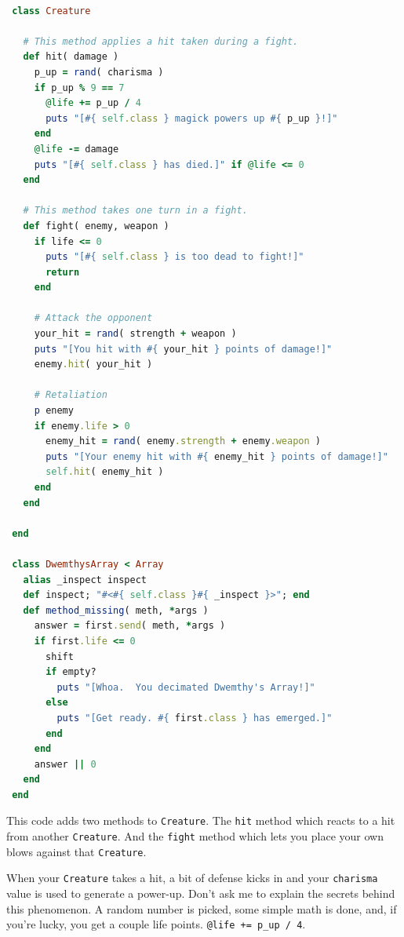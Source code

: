 \documentclass[10pt,twoside]{report}
\begin{document}
\begin{lstlisting}[basicstyle=\ttfamily\color{basiccolor},
    commentstyle = \ttfamily\color{commentcolor},
    keywordstyle=\ttfamily\color{keywordscolor},
    stringstyle=\color{stringcolor},
    language=Ruby,
    basicstyle=\small\ttfamily,
    showstringspaces=false,
  ]

 class Creature

   # This method applies a hit taken during a fight.
   def hit( damage )
     p_up = rand( charisma )
     if p_up % 9 == 7
       @life += p_up / 4
       puts "[#{ self.class } magick powers up #{ p_up }!]"
     end
     @life -= damage
     puts "[#{ self.class } has died.]" if @life <= 0
   end

   # This method takes one turn in a fight.
   def fight( enemy, weapon )
     if life <= 0
       puts "[#{ self.class } is too dead to fight!]"
       return
     end

     # Attack the opponent
     your_hit = rand( strength + weapon )
     puts "[You hit with #{ your_hit } points of damage!]"
     enemy.hit( your_hit )

     # Retaliation
     p enemy
     if enemy.life > 0
       enemy_hit = rand( enemy.strength + enemy.weapon )
       puts "[Your enemy hit with #{ enemy_hit } points of damage!]"
       self.hit( enemy_hit )
     end
   end

 end

 class DwemthysArray < Array
   alias _inspect inspect
   def inspect; "#<#{ self.class }#{ _inspect }>"; end
   def method_missing( meth, *args )
     answer = first.send( meth, *args )
     if first.life <= 0
       shift
       if empty?
         puts "[Whoa.  You decimated Dwemthy's Array!]"
       else
         puts "[Get ready. #{ first.class } has emerged.]"
       end
     end
     answer || 0
   end
 end

\end{lstlisting}


This code adds two methods to \lstinline[breaklines=true]|Creature|.
The \lstinline[breaklines=true]|hit| method which reacts to a hit from
another \lstinline[breaklines=true]|Creature|.  And the
\lstinline[breaklines=true]|fight| method which lets you place your
own blows against that \lstinline[breaklines=true]|Creature|.

When your \lstinline[breaklines=true]|Creature| takes a hit, a bit of
defense kicks in and your \lstinline[breaklines=true]|charisma| value
is used to generate a power-up.  Don't ask me to explain the secrets
behind this phenomenon.  A random number is picked, some simple math
is done, and, if you're lucky, you get a couple life points.
\lstinline[breaklines=true]|@life += p_up / 4|.
\end{document}

